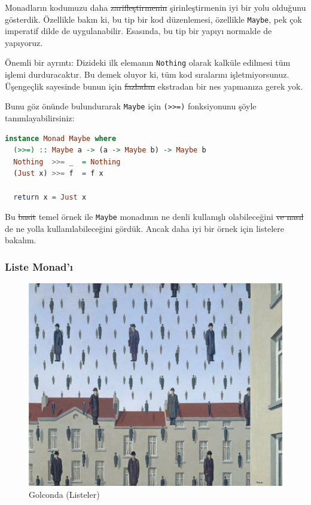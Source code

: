 \documentclass[a4paper,14pt,openany]{extbook} %
\begin{document}
Monadların kodumuzu daha \st{zarifleştirmenin} şirinleştirmenin iyi bir yolu olduğunu gösterdik. Özellikle bakın ki, bu tip bir kod düzenlemesi, özellikle
\lstinline!Maybe!, pek çok imperatif dilde de uygulanabilir. Esasında, bu tip
bir yapıyı normalde de yapıyoruz.

  Önemli bir ayrıntı: Dizideki ilk elemanın \lstinline!Nothing! olarak
  kalküle edilmesi tüm işlemi durduracaktır. Bu demek oluyor ki, tüm
  kod sıralarını işletmiyorsunuz. Üşengeçlik sayesinde bunun için \st{fazladan} ekstradan bir nes yapmanıza gerek yok.

Bunu göz önünde bulundurarak \lstinline!Maybe! için \lstinline!(>>=)!
fonksiyonunu şöyle tanımlayabilirsiniz:

\begin{lstlisting}[language=Haskell]
  instance Monad Maybe where
  (>>=) :: Maybe a -> (a -> Maybe b) -> Maybe b
  Nothing  >>= _  = Nothing
  (Just x) >>= f  = f x

  return x = Just x
\end{lstlisting}

Bu \st{basit} temel örnek ile \lstinline!Maybe! monadının ne denli kullanışlı
olabileceğini \st{ve nasıl} de ne yolla kullanılabileceğini gördük. Ancak daha iyi bir örnek için listelere bakalım.
\pagebreak

\subsubsection{Liste Monad'ı}\label{liste-monadux131}
\begin{figure}%
  \centering
  \includegraphics{img/golconda.jpg} %
  \caption{Golconda (Listeler)}
\end{figure}
\end{document}
